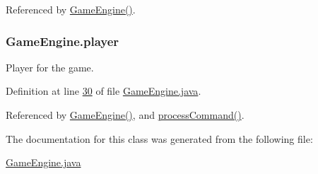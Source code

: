 Referenced by \hyperlink{GameEngine_8java_source_l00059}{Game\-Engine()}.

\hypertarget{classGameEngine_a4666c6719428cc43014b30b305eeef5d}{
\subsubsection[{player}]{ Game\-Engine.\-player\hspace{0.3cm}{\ttfamily [private]}}}\label{classGameEngine_a4666c6719428cc43014b30b305eeef5d}


Player for the game. 



Definition at line \hyperlink{GameEngine_8java_source_l00030}{30} of file \hyperlink{GameEngine_8java_source}{Game\-Engine.\-java}.



Referenced by \hyperlink{GameEngine_8java_source_l00059}{Game\-Engine()}, and \hyperlink{GameEngine_8java_source_l00179}{process\-Command()}.



The documentation for this class was generated from the following file\-:\begin{DoxyCompactItemize}
\item 
\hyperlink{GameEngine_8java}{Game\-Engine.\-java}\end{DoxyCompactItemize}
